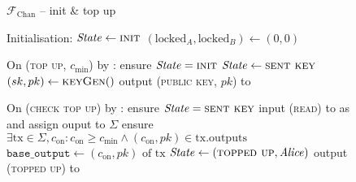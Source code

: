 \begin{figure}[H]
  \begin{systembox}{$\mathcal{F}_{\mathrm{Chan}}$ -- init \& top up}
    \begin{algorithmic}[1]
      \State Initialisation: 
      \Indent
        \State $\mathit{State} \gets \textsc{init}$
        \State $(\mathrm{locked}_A, \mathrm{locked}_B) \gets (0, 0)$
      \EndIndent
      \Statex

      \State On (\textsc{top up}, $c_{\mathrm{min}}$) by \alice:
      \label{code:functionality:chan:skeleton:init:top_up:start}
      \Indent
        \State ensure $\mathit{State} = \textsc{init}$
        \State $\mathit{State} \gets \textsc{sent key}$
        \State $(sk, pk) \gets \textsc{keyGen}()$
        \State output (\textsc{public key}, $pk$) to \alice
        \label{code:functionality:chan:skeleton:init:top_up:end}
      \EndIndent
      \Statex

      \State On (\textsc{check top up}) by \alice:
      \label{code:functionality:chan:skeleton:init:check_top_up:start}
      \Indent
        \State ensure $\mathit{State} = \textsc{sent key}$
        \State input (\textsc{read}) to \ledger as \alice and assign ouput to
        $\Sigma$
        \State ensure $\exists \mathrm{tx} \in \Sigma, c_{\mathrm{on}}:
        c_{\mathrm{on}} \geq c_{\mathrm{min}} \wedge (c_{\mathrm{on}}, pk) \in
        \mathrm{tx.outputs}$
        \State $\mathtt{base\_output} \gets (c_{\mathrm{on}}, pk) \text{ of tx}$
        \State $\mathit{State} \gets (\textsc{topped up}, \mathit{Alice})$
        \State output (\textsc{topped up}) to \alice
        \label{code:functionality:chan:skeleton:init:check_top_up:end}
      \EndIndent
    \end{algorithmic}
  \end{systembox}
  \caption{}
  \label{code:functionality:chan:skeleton:init}
\end{figure}

